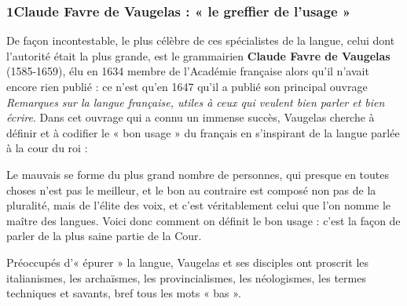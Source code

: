 \subsubsection*{1\quad Claude Favre de Vaugelas : « le greffier de l’usage »}
De façon incontestable, le plus célèbre de ces spécialistes de la langue, celui dont l’autorité était la plus grande, est le grammairien \textbf{Claude Favre de Vaugelas} (1585-1659),
élu en 1634 membre de l’Académie française alors qu’il n’avait encore rien publié : ce n’est qu’en 1647 qu’il a publié son principal ouvrage \textit{Remarques sur la langue française, utiles à ceux qui veulent bien parler et bien écrire}. Dans cet ouvrage qui a connu un immense succès, Vaugelas cherche à définir et à codifier le « bon usage » du français en s’inspirant de la langue parlée à la cour du roi :
\begin{lecture}{}
Le mauvais se forme du plus grand nombre de personnes, qui presque en toutes choses n’est pas le meilleur, et le bon au contraire est composé non pas de la pluralité, mais de l’élite des voix, et c’est véritablement celui que l’on nomme le maître des langues. Voici donc comment on définit le bon usage : c’est la façon de parler de la plus saine partie de la Cour.
\end{lecture}
Préoccupés d’« épurer » la langue, Vaugelas et ses disciples ont proscrit les italianismes, les archaïsmes, les provincialismes, les néologismes, les termes techniques et savants, bref tous les mots « bas ».
